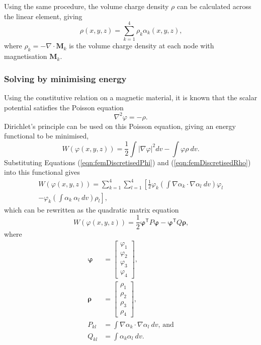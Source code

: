 Using the same procedure, the volume charge density \(\rho\) can be calculated across the linear element, giving
\begin{equation}\label{eqn:femDiscretisedRho}
    \rho\left(x,y,z\right) = \sum_{k = 1}^4 \rho_k \alpha_k\left(x,y,z\right) \text{,}
\end{equation}
where \(\rho_k = -\nabla \cdot \mathbf{M}_k\) is the volume charge density at each node with magnetisation \(\mathbf{M}_k\).

\subsubsection*{Solving by minimising energy}
Using the constitutive relation on a magnetic material, it is known that the scalar potential satisfies the Poisson equation
\begin{equation}
    \nabla ^2 \varphi = -\rho \text{.}
\end{equation}
Dirichlet's principle can be used on this Poisson equation, giving an energy functional to be minimised,
\begin{equation}
    W\left(\varphi\left(x,y,z\right)\right) = \frac{1}{2} \int \left| \nabla \varphi \right|^2 dv - \int \varphi \rho \ dv \text{.}
\end{equation}
Substituting Equations (\ref{eqn:femDiscretisedPhi}) and (\ref{eqn:femDiscretisedRho}) into this functional gives
\begin{align}
    W\left(\varphi\left(x,y,z\right)\right) = \sum_{k = 1}^4 \sum_{l = 1}^4 \left[ \frac{1}{2} \varphi_k \left( \int \nabla \alpha_k \cdot \nabla \alpha_l \ dv \right) \varphi_l \right. \nonumber \\
    \left. - \varphi_k \left( \int \alpha_k \ \alpha_l \ dv \right) \rho_l \right] \text{,}
\end{align}
which can be rewritten as the quadratic matrix equation
\begin{equation}\label{eqn:femQuadMatEqn}
    W\left(\varphi\left(x,y,z\right)\right) = \frac{1}{2}\bm{\varphi}^\mathsf{T} P \bm{\varphi} - \bm{\varphi}^\mathsf{T} Q \bm{\rho} \text{,}
\end{equation}
where
\begin{align*}
    \bm{\varphi} &= \begin{bmatrix} \varphi_1 \\ \varphi_2 \\ \varphi_3 \\ \varphi_4 \end{bmatrix} \text{,} \\
    \bm{\rho} &= \begin{bmatrix} \rho_1 \\ \rho_2 \\ \rho_3 \\ \rho_4 \end{bmatrix} \text{,} \\
    P_{kl} &= \int \nabla \alpha_k \cdot \nabla \alpha_l \ dv \text{, and} \\
    Q_{kl} &= \int \alpha_k \alpha_l \ dv \text{.}
\end{align*}

